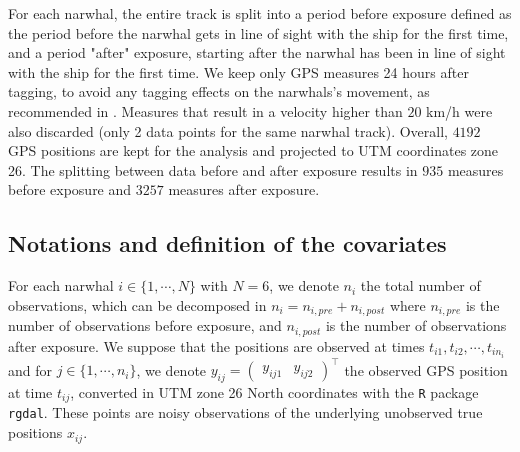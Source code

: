 \documentclass[11pt]{article}
\newcommand {\1}{\mathbb{1}}
\begin{document}
For each narwhal, the entire track is split into a period before exposure defined as the period before the narwhal gets in line of sight with the ship for the first time, and a period "after" exposure, starting after the narwhal has been in line of sight with the ship for the first time. We keep only GPS measures 24 
hours after tagging, to avoid any tagging effects on the narwhals's movement, as recommended in \cite{heide-jorgensen_behavioral_2021}.
Measures that result in a velocity higher than $20$ km/h were also discarded (only 2 data points for the same narwhal track).
Overall, $4192$ GPS positions are kept for the analysis and projected to UTM coordinates zone 26. The splitting between data before and after exposure results in $935$ measures before exposure and $3257$ measures after exposure.

\subsection{Notations and definition of the covariates}
\label{subsection: covariates}

For each narwhal $i \in \{1,\cdots,N\}$ with $N=6$, we denote $n_i$ the total number of observations, which can be decomposed in $n_i=n_{i,pre}+n_{i,post}$ where $n_{i,pre}$ is the number of observations before exposure, and $n_{i,post}$ is the number of observations after exposure. We suppose that the positions are observed at times $t_{i1}, t_{i2}, \cdots,t_{in_i}$ and  for $j \in \{1,\cdots,n_i\}$, we denote $y_{ij}=\begin{pmatrix} y_{ij1} & y_{ij2} \end{pmatrix}^\top$ the observed GPS position at time $t_{ij}$, converted in UTM zone 26 North coordinates with the \texttt{R} package \texttt{rgdal}. These points are noisy observations of the underlying unobserved true positions $x_{ij}$.\\
\end{document}
